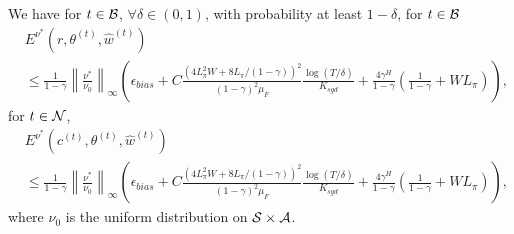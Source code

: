 \begin{lemma}\label{Lemma_SGD_convergence}
We have for $t\in{\mathcal{B}}$, $\forall\delta\in(0,1)$, with probability at least $1-\delta$,
for $t\in{\mathcal{B}}$
$$
\begin{aligned}
    & E^{\nu^*}(r,\theta^{(t)}, \hat w^{(t)})\\
    &\leq \frac{1}{1-\gamma}\left\|\frac{\nu^*}{\nu_0}\right\|_\infty\left(\epsilon_{bias}+C\frac{(4L_\pi^2W+8L_\pi/(1-\gamma))^2}{(1-\gamma)^2\mu_F}\frac{\log(T/\delta)}{K_{sgd}}+\frac{4\gamma^H}{1-\gamma}\left(\frac{1}{1-\gamma}+WL_\pi\right)\right),
\end{aligned}
$$
for $t\in{\mathcal{N}}$,
$$
\begin{aligned}
     &E^{\nu^*}(c^{(t)},\theta^{(t)}, \hat w^{(t)})\\
     &\leq \frac{1}{1-\gamma}\left\|\frac{\nu^*}{\nu_0}\right\|_\infty\left(\epsilon_{bias}+C\frac{(4L_\pi^2W+8L_\pi/(1-\gamma))^2}{(1-\gamma)^2\mu_F}\frac{\log(T/\delta)}{K_{sgd}}+\frac{4\gamma^H}{1-\gamma}\left(\frac{1}{1-\gamma}+WL_\pi\right)\right),
\end{aligned}
$$
where $\nu_0$ is the uniform distribution on ${\mathcal{S}}\times{\mathcal{A}}$.
\end{lemma}

